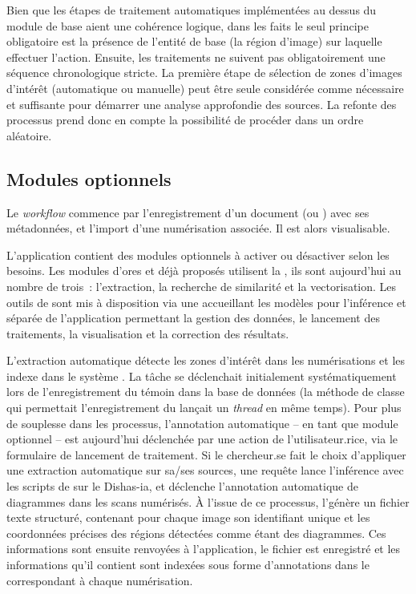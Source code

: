 Bien que les étapes de traitement automatiques implémentées au dessus du
module de base aient une cohérence logique, dans les faits le seul
principe obligatoire est la présence de l'entité de base (la région
d'image) sur laquelle effectuer l'action. Ensuite, les traitements ne
suivent pas obligatoirement une séquence chronologique stricte. La
première étape de sélection de zones d'images d'intérêt (automatique ou
manuelle) peut être seule considérée comme nécessaire et suffisante pour
démarrer une analyse approfondie des sources. La refonte des processus
prend donc en compte la possibilité de procéder dans un ordre aléatoire.

\hypertarget{modules-optionnels}{%
\subsection{Modules optionnels}\label{modules-optionnels}}

Le \textit{workflow} commence par l'enregistrement d'un document (\wit ou
\ser) avec ses métadonnées, et l'import d'une numérisation associée. Il
est alors visualisable.

L'application contient des modules optionnels à activer ou désactiver
selon les besoins. Les modules d'ores et déjà proposés utilisent la
\cv, ils sont aujourd'hui au nombre de trois~:
l'extraction, la recherche de similarité et la vectorisation. Les outils
de \dl sont mis à disposition via une \api accueillant
les modèles pour l'inférence et séparée de l'application permettant la
gestion des données, le lancement des traitements, la visualisation et
la correction des résultats.

L'extraction automatique détecte les zones d'intérêt dans les
numérisations et les indexe dans le système \sas. La tâche se déclenchait
initialement systématiquement lors de l'enregistrement du témoin dans la
base de données (la méthode de classe qui permettait l'enregistrement du
\wit lançait un \emph{thread} en même temps). Pour plus de souplesse
dans les processus, l'annotation automatique -- en tant que module
optionnel -- est aujourd'hui déclenchée par une action de l'utilisateur.rice,
via le formulaire de lancement de traitement. Si le chercheur.se fait le
choix d'appliquer une extraction automatique sur sa/ses sources, une
requête \api lance l'inférence avec les scripts de \yolov sur le \gpu
Dishas-ia, et déclenche l'annotation automatique de diagrammes dans les
scans numérisés. À l'issue de ce processus, l'\api génère un fichier
texte structuré, contenant pour chaque image son identifiant unique et
les coordonnées précises des régions détectées comme étant des
diagrammes. Ces informations sont ensuite renvoyées à l'application, le
fichier est enregistré et les informations qu'il contient sont indexées
sous forme d'annotations dans le \man \iiif correspondant à chaque
numérisation.

